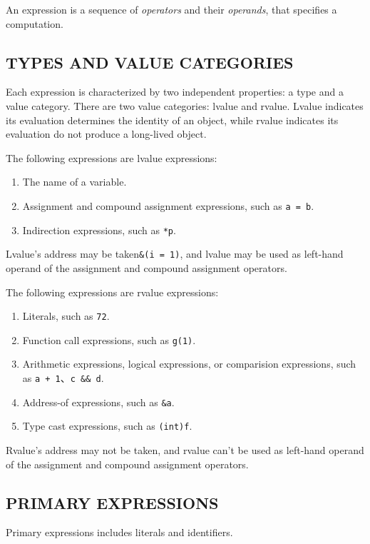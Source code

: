 \documentclass{article}
\begin{document}
An expression is a sequence of \textit{operators} and their \textit{operands}, that specifies a computation.

\subsection{TYPES AND VALUE CATEGORIES}

Each expression is characterized by two independent properties: a type and a value category. There are two value categories: lvalue and rvalue. Lvalue indicates its evaluation determines the identity of an object, while rvalue indicates its evaluation do not produce a long-lived object.

The following expressions are lvalue expressions:
\begin{enumerate}
	\item The name of a variable.
	\item Assignment and compound assignment expressions, such as \verb|a = b|.
	\item Indirection expressions, such as \verb|*p|.
\end{enumerate}

Lvalue's address may be taken\verb|&(i = 1)|, and lvalue may be used as left-hand operand of the assignment and compound assignment operators.

The following expressions are rvalue expressions:
\begin{enumerate}
	\item Literals, such as \verb|72|.
	\item Function call expressions, such as \verb|g(1)|.
	\item Arithmetic expressions, logical expressions, or comparision expressions, such as \verb|a + 1|、\verb|c && d|.
	\item Address-of expressions, such as \verb|&a|.
	\item Type cast expressions, such as \verb|(int)f|.
\end{enumerate}

Rvalue's address may not be taken, and rvalue can't be used as left-hand operand of the assignment and compound assignment operators.

\subsection{PRIMARY EXPRESSIONS}

Primary expressions includes literals and identifiers.
\end{document}
